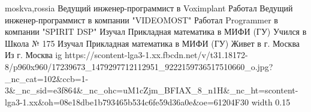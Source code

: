  
 
 
 
 

\par
moskva,rossia
Ведущий инженер-программист в Voximplant
Работал Ведущий инженер-программист в компании "VIDEOMOST"
Работал Programmer в компании "SPIRIT DSP"
Изучал Прикладная математика в МИФИ (ГУ)
Учился в Школа № 175
Изучал Прикладная математика в МИФИ (ГУ)
Живет в г. Москва
Из г. Москва
\ifcmt
  ig https://scontent-lga3-1.xx.fbcdn.net/v/t31.18172-8/p960x960/17239673_1479297712112951_9222159736517510660_o.jpg?_nc_cat=102&ccb=1-3&_nc_sid=e3f864&_nc_ohc=uM1cZjm_BFIAX_8_n1H&_nc_ht=scontent-lga3-1.xx&oh=08e18dbe1b793465b534c6fe59d36a0e&oe=61204F30
  width 0.15
\fi
